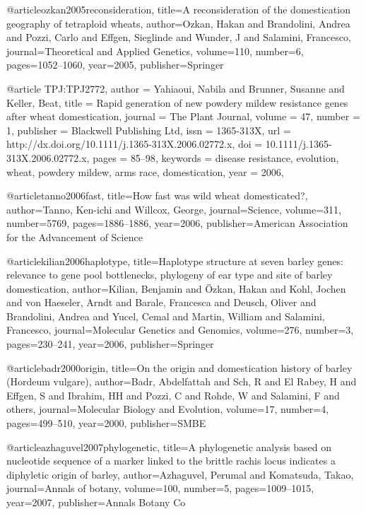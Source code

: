 @article{ozkan2005reconsideration,
  title={A reconsideration of the domestication geography of tetraploid wheats},
  author={Ozkan, Hakan and Brandolini, Andrea and Pozzi, Carlo and Effgen, Sieglinde and Wunder, J and Salamini, Francesco},
  journal={Theoretical and Applied Genetics},
  volume={110},
  number={6},
  pages={1052--1060},
  year={2005},
  publisher={Springer}
}

@article {TPJ:TPJ2772,
author = {Yahiaoui, Nabila and Brunner, Susanne and Keller, Beat},
title = {Rapid generation of new powdery mildew resistance genes after wheat domestication},
journal = {The Plant Journal},
volume = {47},
number = {1},
publisher = {Blackwell Publishing Ltd},
issn = {1365-313X},
url = {http://dx.doi.org/10.1111/j.1365-313X.2006.02772.x},
doi = {10.1111/j.1365-313X.2006.02772.x},
pages = {85--98},
keywords = {disease resistance, evolution, wheat, powdery mildew, arms race, domestication},
year = {2006},
}

@article{tanno2006fast,
  title={How fast was wild wheat domesticated?},
  author={Tanno, Ken-ichi and Willcox, George},
  journal={Science},
  volume={311},
  number={5769},
  pages={1886--1886},
  year={2006},
  publisher={American Association for the Advancement of Science}
}

@article{kilian2006haplotype,
  title={Haplotype structure at seven barley genes: relevance to gene pool bottlenecks, phylogeny of ear type and site of barley domestication},
  author={Kilian, Benjamin and {\"O}zkan, Hakan and Kohl, Jochen and von Haeseler, Arndt and Barale, Francesca and Deusch, Oliver and Brandolini, Andrea and Yucel, Cemal and Martin, William and Salamini, Francesco},
  journal={Molecular Genetics and Genomics},
  volume={276},
  number={3},
  pages={230--241},
  year={2006},
  publisher={Springer}
}

@article{badr2000origin,
  title={On the origin and domestication history of barley (Hordeum vulgare)},
  author={Badr, Abdelfattah and Sch, R and El Rabey, H and Effgen, S and Ibrahim, HH and Pozzi, C and Rohde, W and Salamini, F and others},
  journal={Molecular Biology and Evolution},
  volume={17},
  number={4},
  pages={499--510},
  year={2000},
  publisher={SMBE}
}

@article{azhaguvel2007phylogenetic,
  title={A phylogenetic analysis based on nucleotide sequence of a marker linked to the brittle rachis locus indicates a diphyletic origin of barley},
  author={Azhaguvel, Perumal and Komatsuda, Takao},
  journal={Annals of botany},
  volume={100},
  number={5},
  pages={1009--1015},
  year={2007},
  publisher={Annals Botany Co}
}

